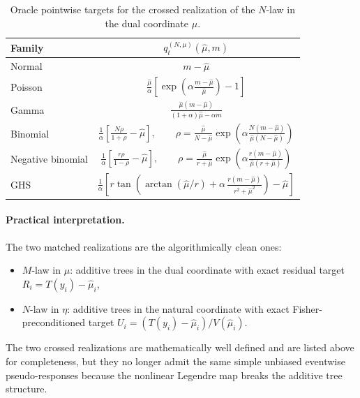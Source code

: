 \documentclass[11pt]{article}
\begin{document}
\begin{table}[t]
\centering
\renewcommand{\arraystretch}{1.3}
\setlength{\tabcolsep}{4.5pt}
\begin{tabular}{lc}
\hline
Family & \(q_t^{(N,\mu)}(\hat\mu,m)\) \\
\hline
Normal
&
\(\displaystyle m-\hat\mu\)
\\[1.2ex]

Poisson
&
\(\displaystyle
\frac{\hat\mu}{\alpha}
\left[
\exp\!\left(\alpha\frac{m-\hat\mu}{\hat\mu}\right)-1
\right]
\)
\\[2.0ex]

Gamma
&
\(\displaystyle
\frac{\hat\mu(m-\hat\mu)}{(1+\alpha)\hat\mu-\alpha m}
\)
\\[2.0ex]

Binomial
&
\(\displaystyle
\frac{1}{\alpha}
\left[
\frac{N\rho}{1+\rho}-\hat\mu
\right],
\qquad
\rho=
\frac{\hat\mu}{N-\hat\mu}
\exp\!\left(
\alpha\frac{N(m-\hat\mu)}{\hat\mu(N-\hat\mu)}
\right)
\)
\\[3.0ex]

Negative binomial
&
\(\displaystyle
\frac{1}{\alpha}
\left[
\frac{r\rho}{1-\rho}-\hat\mu
\right],
\qquad
\rho=
\frac{\hat\mu}{r+\hat\mu}
\exp\!\left(
\alpha\frac{r(m-\hat\mu)}{\hat\mu(r+\hat\mu)}
\right)
\)
\\[3.0ex]

GHS
&
\(\displaystyle
\frac{1}{\alpha}
\left[
r\tan\!\left(
\arctan(\hat\mu/r)+\alpha\,\frac{r(m-\hat\mu)}{r^2+\hat\mu^2}
\right)-\hat\mu
\right]
\)
\\[3.0ex]
\hline
\end{tabular}
\caption{Oracle pointwise targets for the crossed realization of the \(N\)-law in the dual coordinate \(\mu\).}
\label{tab:nef-qvf-Nmu}
\end{table}

\paragraph{Practical interpretation.}
The two matched realizations are the algorithmically clean ones:
\begin{itemize}
\item \(M\)-law in \(\mu\): additive trees in the dual coordinate with exact residual target \(R_i=T(y_i)-\hat\mu_i\),
\item \(N\)-law in \(\eta\): additive trees in the natural coordinate with exact Fisher-preconditioned target \(U_i=(T(y_i)-\hat\mu_i)/V(\hat\mu_i)\).
\end{itemize}
The two crossed realizations are mathematically well defined and are listed above for completeness, but they no longer admit the same simple unbiased eventwise pseudo-responses because the nonlinear Legendre map breaks the additive tree structure.
\end{document}

